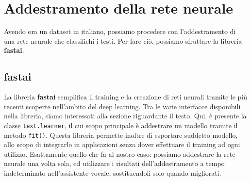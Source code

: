 \section{Addestramento della rete neurale}
Avendo ora un dataset in italiano, possiamo procedere con l'addestramento di una rete neurale che classifichi i testi. Per fare ciò, possiamo sfruttare la libreria \textbf{fastai}.
\subsection{fastai}
La libreria \textbf{fastai} semplifica il training e la creazione di reti neurali tramite le più recenti scoperte nell'ambito del deep learning. Tra le varie interfacce disponibili nella libreria, siamo interessati alla sezione riguardante il testo. Qui, è presente la classe \texttt{text.learner}, il cui scopo principale è addestrare un modello tramite il metodo \texttt{fit()}. Questa libreria permette inoltre di esportare suddetto modello, allo scopo di integrarlo in applicazioni senza dover effettuare il training ad ogni utilizzo. Esattamente quello che fa al nostro caso: possiamo addestrare la rete neurale una volta sola, ed utilizzare i risultati dell'addestramento a tempo indeterminato nell'assistente vocale, sostituendoli solo quando migliorati.
